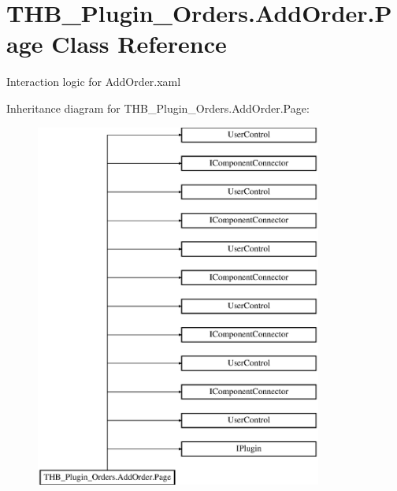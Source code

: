 \hypertarget{class_t_h_b___plugin___orders_1_1_add_order_1_1_page}{}\section{T\+H\+B\+\_\+\+Plugin\+\_\+\+Orders.\+Add\+Order.\+Page Class Reference}
\label{class_t_h_b___plugin___orders_1_1_add_order_1_1_page}


Interaction logic for Add\+Order.\+xaml  


Inheritance diagram for T\+H\+B\+\_\+\+Plugin\+\_\+\+Orders.\+Add\+Order.\+Page\+:\begin{figure}[H]
\begin{center}
\leavevmode
\includegraphics[height=12.000000cm]{dd/d20/class_t_h_b___plugin___orders_1_1_add_order_1_1_page}
\end{center}
\end{figure}

